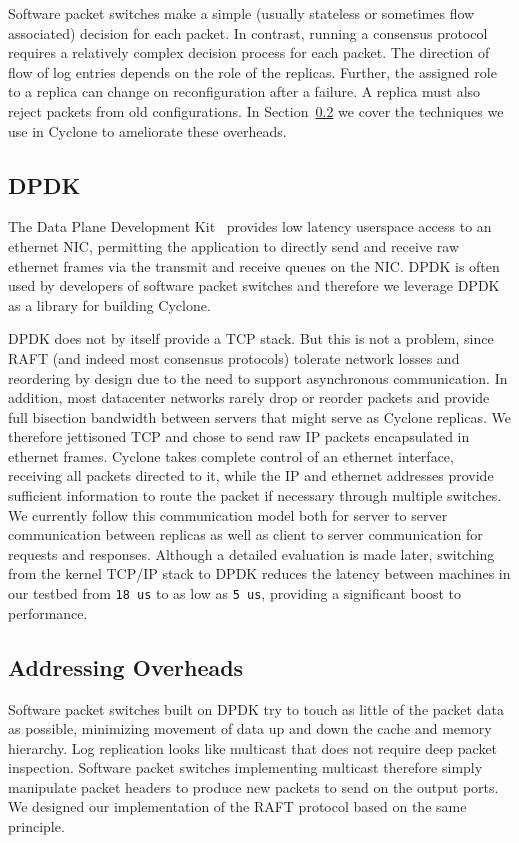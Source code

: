 \documentclass[pageno]{jpaper}
\begin{document}
Software packet switches make a simple (usually stateless or
sometimes flow associated) decision for each packet. In contrast, running a
consensus protocol requires a relatively complex decision process for each
packet. The direction of flow of log entries depends on the role of the
replicas. Further, the assigned role to a replica can change on reconfiguration
after a failure. A replica must also reject packets from old configurations. In
Section~\ref{sec:dm} we cover the techniques we use in Cyclone to ameliorate
these overheads.

\subsection{DPDK}
\label{sec:netprot}
The Data Plane Development Kit~\cite{dpdk} provides low latency userspace access
to an ethernet NIC, permitting the application to directly send and receive raw
ethernet frames via the transmit and receive queues on the NIC. DPDK is often
used by developers of software packet switches and therefore we leverage
DPDK as a library for building Cyclone.

DPDK does not by itself provide a TCP stack. But this is not a problem, since
RAFT (and indeed most consensus protocols) tolerate network losses and
reordering by design due to the need to support asynchronous communication. In
addition, most datacenter networks rarely drop or reorder packets and provide
full bisection bandwidth between servers that might serve as Cyclone replicas. We
therefore jettisoned TCP and chose to send raw IP packets encapsulated in
ethernet frames. Cyclone takes complete control of an ethernet interface,
receiving all packets directed to it, while the IP and ethernet addresses
provide sufficient information to route the packet if necessary through multiple
switches. We currently follow this communication model both for server to server
communication between replicas as well as client to server communication for
requests and responses. Although a detailed evaluation is made later, switching
from the kernel TCP/IP stack to DPDK reduces the latency between machines in our
testbed from {\tt 18 us} to as low as {\tt 5 us}, providing a significant boost
to performance.

\subsection{Addressing Overheads}
\label{sec:dm}
Software packet switches built on DPDK try to touch as little of the packet data
as possible, minimizing movement of data up and down the cache and memory
hierarchy. Log replication looks like multicast that does not require deep
packet inspection. Software packet switches implementing multicast therefore
simply manipulate packet headers to produce new packets to send on the output
ports. We designed our implementation of the RAFT protocol based on the same
principle.
\end{document}
